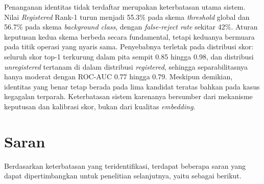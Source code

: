 Penanganan identitas tidak terdaftar merupakan keterbatasan utama sistem.
Nilai \textit{Registered} Rank-1 turun menjadi 55.3\% pada skema
\textit{threshold} global dan 56.7\% pada skema \textit{background class},
dengan \textit{false-reject rate} sekitar 42\%. Aturan keputusan kedua skema
berbeda secara fundamental, tetapi keduanya bermuara pada titik operasi yang
nyaris sama. Penyebabnya terletak pada distribusi skor: seluruh skor top-1
terkurung dalam pita sempit 0.85 hingga 0.98, dan distribusi
\textit{unregistered} tertanam di dalam distribusi \textit{registered},
sehingga separabilitasnya hanya moderat dengan ROC-AUC 0.77 hingga 0.79.
Meskipun demikian, identitas yang benar tetap berada pada lima kandidat
teratas bahkan pada kasus kegagalan terparah. Keterbatasan sistem karenanya
bersumber dari mekanisme keputusan dan kalibrasi skor, bukan dari kualitas
\textit{embedding}.


\section{Saran}

Berdasarkan keterbatasan yang teridentifikasi, terdapat beberapa saran yang dapat dipertimbangkan
untuk penelitian selanjutnya, yaitu sebagai berikut.

